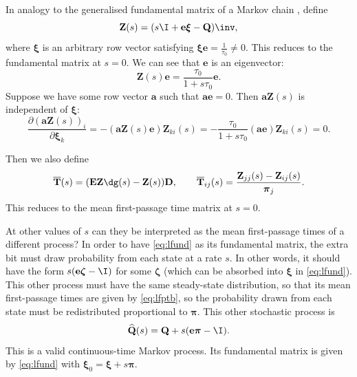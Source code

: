 \documentclass[12pt]{article}
\newcommand{\onev}{\mathbf{e}}
\newcommand{\onem}{\mathbf{E}}
\newcommand{\MM}{\mathbf{Q}}
\newcommand{\eq}{\pib}
\newcommand{\fpt}{\mathbf{T}}
\newcommand{\fptb}{\overline{\fpt}}
\newcommand{\fund}{\mathbf{Z}}
\newcommand{\D}{\mathbf{D}}
\newcommand{\pib}{\boldsymbol{\pi}}
\newcommand{\arow}{\boldsymbol{\xi}}
\renewcommand{\pdiff}[2]{\frac{\partial #1}{\partial #2}}
\newcommand{\shift}[1]{\widehat{#1}}
\begin{document}
In analogy to the generalised fundamental matrix of a Markov chain \cite{Kemeny1981fund}, define
%
\begin{equation}\label{eq:lfund}
  \fund(s) = (s \I + \onev \arow -\MM)\inv,
\end{equation}
%
where $\arow$ is an arbitrary row vector satisfying $\arow \onev = \frac{1}{\tau_0} \neq 0$.
This reduces to the fundamental matrix at $s=0$.
We can see that $\onev$ is an eigenvector:
%
\begin{equation}\label{eq:lfundrowsum}
  \fund(s)\onev = \frac{\tau_0}{1+s\tau_0}\onev.
\end{equation}
%
Suppose we have some row vector $\mathbf{a}$ such that $\mathbf{a}\onev=0$.
Then $\mathbf{a}\fund(s)$ is independent of $\arow$:
%
\begin{equation}\label{eq:alfund}
  \pdiff{(\mathbf{a}\fund(s))_i}{\arow_k} = -(\mathbf{a}\fund(s)\onev) \fund_{ki}(s)
      = -\frac{\tau_0}{1+s\tau_0} (\mathbf{a}\onev) \fund_{ki}(s) = 0.
\end{equation}
%

Then we also define
%
\begin{equation}\label{eq:lfptb}
  \fptb(s) = (\onem \fund\dg(s)-\fund(s))\D,
  \qquad
  \fptb_{ij}(s) = \frac{\fund_{jj}(s)-\fund_{ij}(s)}{\eq_j}.
\end{equation}
%
This reduces to the mean first-passage time matrix at $s=0$. 

At other values of \(s\) can they be interpreted as the mean first-passage times of a different process?
In order to have \cref{eq:lfund} as its fundamental matrix, the extra bit must draw probability from each state at a rate \(s\).
In other words, it should have the form \(s(\onev \boldsymbol{\zeta} - \I)\) for some \(\boldsymbol{\zeta} \) 
(which can be absorbed into \(\arow\) in \cref{eq:lfund}).
This other process must have the same steady-state distribution, so that its mean first-passage times are given by \cref{eq:lfptb}, so the probability drawn from each state must be redistributed proportional to \(\eq\).
This other stochastic process is
%
\begin{equation}\label{eq:lshift}
  \shift{\MM}(s) = \MM + s (\onev \eq - \I).
\end{equation}
%
This is a valid continuous-time Markov process.
Its fundamental matrix is given by \cref{eq:lfund} with \( \arow_0 = \arow + s \eq \).
\end{document}

